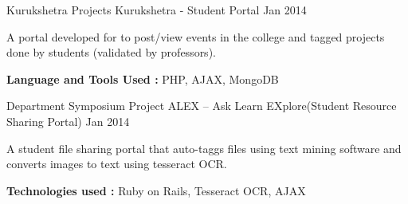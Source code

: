 \begin{cventries}
  \cventry
    {Kurukshetra Projects} %
    {Kurukshetra - Student Portal} %
    {} %
    {Jan 2014} %
    {
      \begin{cvitems}
      \item{A portal developed for to post/view events in the college and tagged projects done by students (validated by professors).}
      \item{\textbf{Language and Tools Used :} PHP, AJAX, MongoDB}
      \end{cvitems}
    }

  \cventry
    {Department Symposium Project} %
    {ALEX – Ask Learn EXplore(Student Resource Sharing Portal)} %
    {} %
    {Jan 2014} %
    {
      \begin{cvitems}
      \item{A student file sharing portal that auto-taggs files using text mining software and converts images to text using tesseract OCR.}
      \item{\textbf{Technologies used :} Ruby on Rails, Tesseract OCR, AJAX}
      \end{cvitems}
    }
\end{cventries}
